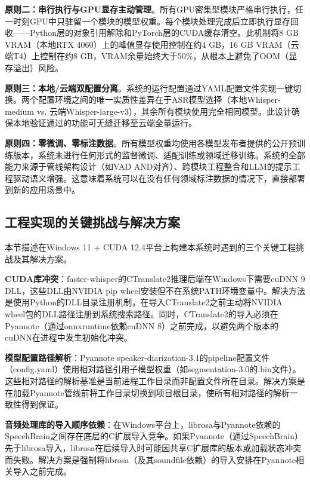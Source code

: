 \documentclass[12pt, a4paper]{article}
\begin{document}
\textbf{原则二：串行执行与GPU显存主动管理}。所有GPU密集型模块严格串行执行，任一时刻GPU中只驻留一个模块的模型权重。每个模块处理完成后立即执行显存回收——Python层的对象引用解除和PyTorch层的CUDA缓存清空。此机制将8 GB VRAM（本地RTX 4060）上的峰值显存使用控制在约4 GB，16 GB VRAM（云端T4）上控制在约8 GB，VRAM余量始终大于50\%，从根本上避免了OOM（显存溢出）风险。

\textbf{原则三：本地/云端双配置分离}。系统的运行配置通过YAML配置文件实现一键切换。两个配置环境之间的唯一实质性差异在于ASR模型选择（本地Whisper-medium vs. 云端Whisper-large-v3），其余所有模块使用完全相同模型。此设计确保本地验证通过的功能可无缝迁移至云端全量运行。

\textbf{原则四：零微调、零标注数据}。所有模型权重均使用各模型发布者提供的公开预训练版本，系统未进行任何形式的监督微调、适配训练或领域迁移训练。系统的全部能力来源于管线架构设计（如VAD AND对齐）、跨模块工程整合和LLM的提示工程驱动语义增强。这意味着系统可以在没有任何领域标注数据的情况下，直接部署到新的应用场景中。

\subsection{工程实现的关键挑战与解决方案}

本节描述在Windows 11 + CUDA 12.4平台上构建本系统时遇到的三个关键工程挑战及其解决方案。

\textbf{CUDA库冲突}：faster-whisper的CTranslate2推理后端在Windows下需要cuDNN 9 DLL，这些DLL由NVIDIA pip wheel安装但不在系统PATH环境变量中。解决方法是使用Python的DLL目录注册机制，在导入CTranslate2之前主动将NVIDIA wheel包的DLL路径注册到系统搜索路径。同时，CTranslate2的导入必须在Pyannote（通过onnxruntime依赖cuDNN 8）之前完成，以避免两个版本的cuDNN在进程中发生初始化冲突。

\textbf{模型配置路径解析}：Pyannote speaker-diarization-3.1的pipeline配置文件（config.yaml）使用相对路径引用子模型权重（如segmentation-3.0的.bin文件）。这些相对路径的解析基准是当前进程工作目录而非配置文件所在目录。解决方案是在加载Pyannote管线前将工作目录切换到项目根目录，使所有相对路径的解析一致性得到保证。

\textbf{音频处理库的导入顺序依赖}：在Windows平台上，librosa与Pyannote依赖的SpeechBrain之间存在底层的C扩展导入竞争。如果Pyannote（通过SpeechBrain）先于librosa导入，librosa在后续导入时可能因共享C扩展库的版本或加载状态冲突而失败。解决方案是强制将librosa（及其soundfile依赖）的导入安排在Pyannote相关导入之前完成。

\end{document}
